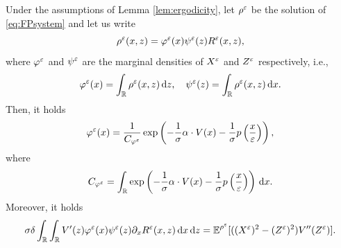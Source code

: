 \documentclass[10pt]{article}
\begin{document}
\begin{lemma}\label{lem:FPMarginal} Under the assumptions of Lemma \ref{lem:ergodicity}, let $\rho^\varepsilon$ be the solution of \eqref{eq:FPsystem} and let us write 
\begin{equation}\label{eq:densityDecomposition}
	\rho^\varepsilon(x, z) = \varphi^\varepsilon(x)\psi^\varepsilon(z)R^\varepsilon(x,z),
\end{equation}
where $\varphi^\varepsilon$ and $\psi^\varepsilon$ are the marginal densities of $X^\varepsilon$ and $Z^\varepsilon$ respectively, i.e., 
\begin{equation}
	\varphi^\varepsilon(x) = \int_{\mathbb{R}} \rho^\varepsilon(x,z) \,\mathrm{d} z, \quad  \psi^\varepsilon(z) = \int_{\mathbb{R}} \rho^\varepsilon(x,z) \,\mathrm{d} x.
\end{equation}
Then, it holds
\begin{equation}\label{eq:marginalX}
	\varphi^\varepsilon(x) = \frac{1}{C_{\varphi^\varepsilon}} \exp\left(-\frac{1}{\sigma} \alpha \cdot V(x) - \frac{1}{\sigma} p \left ( \frac{x}{\varepsilon} \right )\right),
\end{equation}
where
\begin{equation}
	C_{\varphi^\varepsilon} = \int_{\mathbb{R}} \exp\left(-\frac{1}{\sigma} \alpha \cdot V(x) - \frac{1}{\sigma} p \left ( \frac{x}{\varepsilon} \right )\right) \,\mathrm{d} x.
\end{equation}
Moreover, it holds
\begin{equation}
	\sigma \delta \int_{\mathbb{R}} \int_{\mathbb{R}} V'(z) \varphi^\varepsilon(x) \psi^\varepsilon(z) \partial_x R^\varepsilon(x,z) \,\mathrm{d} x \,\mathrm{d} z = \operatorname{\mathbb{E}}^{\rho^\varepsilon}[((X^\varepsilon)^2 - (Z^\varepsilon)^2)V''(Z^\varepsilon)].
\end{equation}
\end{lemma}
\end{document}
